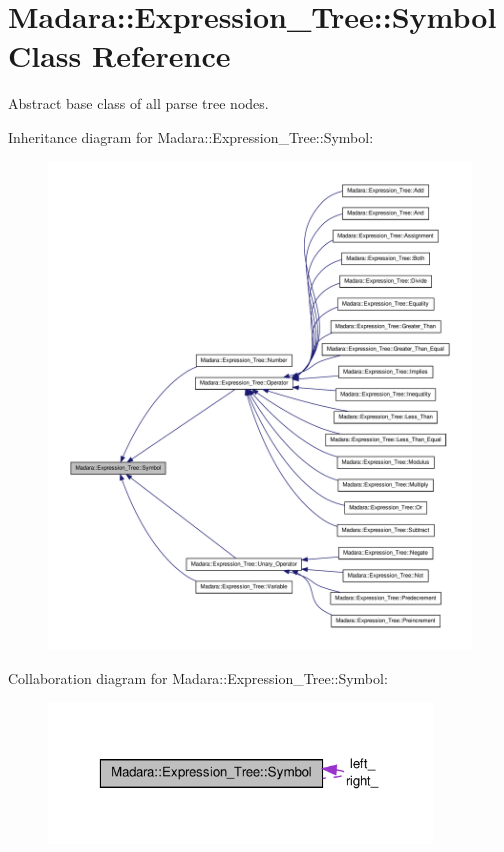 \hypertarget{classMadara_1_1Expression__Tree_1_1Symbol}{
\section{Madara::Expression\_\-Tree::Symbol Class Reference}
\label{d5/d85/classMadara_1_1Expression__Tree_1_1Symbol}
}


Abstract base class of all parse tree nodes.  




Inheritance diagram for Madara::Expression\_\-Tree::Symbol:
\nopagebreak
\begin{figure}[H]
\begin{center}
\leavevmode
\includegraphics[width=400pt]{d4/d02/classMadara_1_1Expression__Tree_1_1Symbol__inherit__graph}
\end{center}
\end{figure}


Collaboration diagram for Madara::Expression\_\-Tree::Symbol:
\nopagebreak
\begin{figure}[H]
\begin{center}
\leavevmode
\includegraphics[width=289pt]{d2/d7a/classMadara_1_1Expression__Tree_1_1Symbol__coll__graph}
\end{center}
\end{figure}
